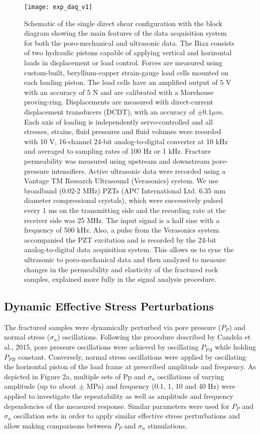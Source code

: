 \documentclass[letterpaper,10pt]{article}
\begin{document}
\newpage

\begin{figure}[ht]
	\centering
	\texttt{[image: exp\_daq\_v1]}
	\caption[]{Schematic of the single direct shear configuration with the block diagram showing the main features of the data acquisition system for both the poro-mechanical and ultrasonic data. The Biax consists of two hydraulic pistons capable of applying vertical and horizontal loads in displacement or load control. Forces are measured using custom-built, beryllium-copper strain-gauge load cells mounted on each loading piston. The load cells have an amplified output of 5 V with an accuracy of 5 N and are calibrated with a Morehouse proving-ring. Displacements are measured with direct-current displacement transducers (DCDT), with an accuracy of $\pm 0.1 \mu m$. Each axis of loading is independently servo-controlled and all stresses, strains, fluid pressures and fluid volumes were recorded with 10 V, 16-channel 24-bit analog-to-digital converter at 10 kHz and averaged to sampling rates of 100 Hz or 1 kHz. Fracture permeability was measured using upstream and downstream pore-pressure intensifiers. Active ultrasonic data were recorded using a Vantage TM Research Ultrasound (Verasonics) system. We use broadband (0.02-2 MHz) PZTs (APC International Ltd. 6.35 mm diameter compressional crystals), which were successively pulsed every 1 ms on the transmitting side and the recording rate at the receiver side was 25 MHz. The input signal is a half sine with a frequency of 500 kHz. Also, a pulse from the Verasonics system accompanied the PZT excitation and is recorded by the 24-bit analog-to-digital data acquisition system. This allows us to sync the ultrasonic to poro-mechanical data and then analyzed to measure changes in the permeability and elasticity of the fractured rock samples, explained more fully in the signal analysis procedure.}
	\label{fig:data_aq}
\end{figure}

\newpage

\subsection{Dynamic Effective Stress Perturbations}
The fractured samples were dynamically perturbed via pore pressure ($P_P$) and normal stress ($\sigma_{n}$) oscillations. Following the procedure described by Candela et al., 2015, pore pressure oscillations were achieved by oscillating $P_{PA}$ while holding $P_{PB}$ constant. Conversely, normal stress oscillations were
applied by oscillating the horizontal piston of the load frame at prescribed amplitude and frequency. 
As depicted in Figure 2a, multiple sets of Pp and $\sigma_n$ oscillations of varying amplitude (up to about $\pm$ MPa)
and frequency (0.1, 1, 10 and 40 Hz) were applied to investigate the repeatability as well as amplitude and
frequency dependencies of the measured response. Similar parameters were used for $P_P$ and $\sigma_{n}$ oscillation sets in order to apply similar effective stress perturbations and allow making comparisons between $P_P$ and $\sigma_{n}$ stimulations.
\end{document}
